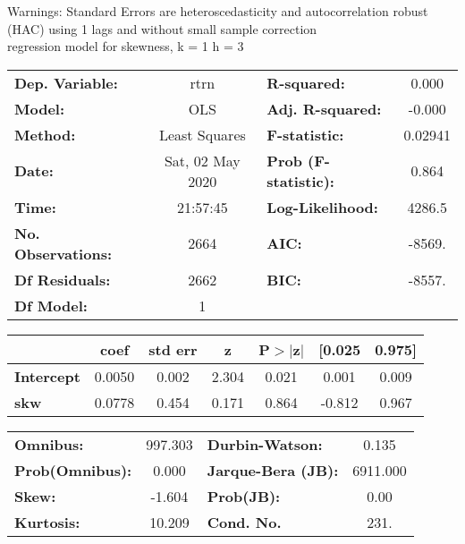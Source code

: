 Warnings: \newline
 [1] Standard Errors are heteroscedasticity and autocorrelation robust (HAC) using 1 lags and without small sample correction\\ 

regression model for skewness, k = 1 h = 3\begin{center}
\begin{tabular}{lclc}
\toprule
\textbf{Dep. Variable:}    &       rtrn       & \textbf{  R-squared:         } &     0.000   \\
\textbf{Model:}            &       OLS        & \textbf{  Adj. R-squared:    } &    -0.000   \\
\textbf{Method:}           &  Least Squares   & \textbf{  F-statistic:       } &   0.02941   \\
\textbf{Date:}             & Sat, 02 May 2020 & \textbf{  Prob (F-statistic):} &    0.864    \\
\textbf{Time:}             &     21:57:45     & \textbf{  Log-Likelihood:    } &    4286.5   \\
\textbf{No. Observations:} &        2664      & \textbf{  AIC:               } &    -8569.   \\
\textbf{Df Residuals:}     &        2662      & \textbf{  BIC:               } &    -8557.   \\
\textbf{Df Model:}         &           1      & \textbf{                     } &             \\
\bottomrule
\end{tabular}
\begin{tabular}{lcccccc}
                   & \textbf{coef} & \textbf{std err} & \textbf{z} & \textbf{P$> |$z$|$} & \textbf{[0.025} & \textbf{0.975]}  \\
\midrule
\textbf{Intercept} &       0.0050  &        0.002     &     2.304  &         0.021        &        0.001    &        0.009     \\
\textbf{skw}       &       0.0778  &        0.454     &     0.171  &         0.864        &       -0.812    &        0.967     \\
\bottomrule
\end{tabular}
\begin{tabular}{lclc}
\textbf{Omnibus:}       & 997.303 & \textbf{  Durbin-Watson:     } &    0.135  \\
\textbf{Prob(Omnibus):} &   0.000 & \textbf{  Jarque-Bera (JB):  } & 6911.000  \\
\textbf{Skew:}          &  -1.604 & \textbf{  Prob(JB):          } &     0.00  \\
\textbf{Kurtosis:}      &  10.209 & \textbf{  Cond. No.          } &     231.  \\
\bottomrule
\end{tabular}
\end{center}

